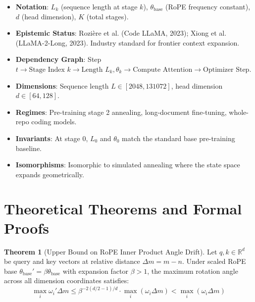 \documentclass[11pt,a4paper]{article}
\theoremstyle{definition}
\newtheorem{theorem}{\textbf{Theorem}}[section]
\begin{document}
\begin{itemize}
    \item \textbf{Notation}: $L_k$ (sequence length at stage $k$), $\theta_{\text{base}}$ (RoPE frequency constant), $d$ (head dimension), $K$ (total stages).
    \item \textbf{Epistemic Status}: Rozière et al. (Code LLaMA, 2023); Xiong et al. (LLaMA-2-Long, 2023). Industry standard for frontier context expansion.
    \item \textbf{Dependency Graph}: Step $t \to \text{Stage Index } k \to \text{Length } L_k, \theta_k \to \text{Compute Attention} \to \text{Optimizer Step}$.
    \item \textbf{Dimensions}: Sequence length $L \in [2048, 131072]$, head dimension $d \in [64, 128]$.
    \item \textbf{Regimes}: Pre-training stage 2 annealing, long-document fine-tuning, whole-repo coding models.
    \item \textbf{Invariants}: At stage 0, $L_0$ and $\theta_0$ match the standard base pre-training baseline.
    \item \textbf{Isomorphisms}: Isomorphic to simulated annealing where the state space expands geometrically.
\end{itemize}

\section{Theoretical Theorems and Formal Proofs}

\begin{theorem}[Upper Bound on RoPE Inner Product Angle Drift]
Let $q, k \in \mathbb{R}^d$ be query and key vectors at relative distance $\Delta m = m - n$. Under scaled RoPE base $\theta_{\text{base}}' = \beta \theta_{\text{base}}$ with expansion factor $\beta > 1$, the maximum rotation angle across all dimension coordinates satisfies:
{\boldmath
\begin{equation}
\max_{i} \omega_i' \Delta m \le \beta^{-2(d/2 - 1)/d} \cdot \max_{i} (\omega_i \Delta m) < \max_i (\omega_i \Delta m)
\end{equation}
}
\end{theorem}
\end{document}
